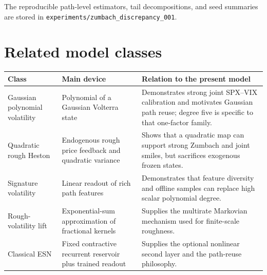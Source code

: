 \documentclass[11pt,a4paper]{article}
\begin{document}
The reproducible path-level estimators, tail decompositions, and seed summaries are stored in
\nolinkurl{experiments/zumbach_discrepancy_001}.

\section{Related model classes}

\begin{center}
\begin{tabularx}{\textwidth}{@{}L{39mm}L{42mm}Y@{}}
\toprule
\textbf{Class} & \textbf{Main device} & \textbf{Relation to the present model} \\
\midrule
Gaussian polynomial volatility & Polynomial of a Gaussian Volterra state & Demonstrates
strong joint SPX--VIX calibration and motivates Gaussian path reuse; degree five is specific
to that one-factor family. \\
Quadratic rough Heston & Endogenous rough price feedback and quadratic variance & Shows that a
quadratic map can support strong Zumbach and joint smiles, but sacrifices exogenous frozen
states. \\
Signature volatility & Linear readout of rich path features & Demonstrates that feature
diversity and offline samples can replace high scalar polynomial degree. \\
Rough-volatility lift & Exponential-sum approximation of fractional kernels & Supplies the
multirate Markovian mechanism used for finite-scale roughness. \\
Classical ESN & Fixed contractive recurrent reservoir plus trained readout & Supplies the
optional nonlinear second layer and the path-reuse philosophy. \\
\bottomrule
\end{tabularx}
\end{center}
\end{document}
